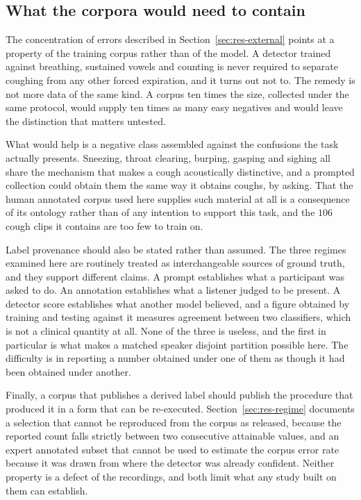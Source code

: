 \documentclass[pdflatex,sn-mathphys-num]{sn-jnl}
\begin{document}
\subsection{What the corpora would need to contain}\label{sec:disc-corpora}

The concentration of errors described in Section~\ref{sec:res-external} points at a
property of the training corpus rather than of the model. A detector trained against
breathing, sustained vowels and counting is never required to separate coughing from any
other forced expiration, and it turns out not to. The remedy is not more data of the same
kind. A corpus ten times the size, collected under the same protocol, would supply ten
times as many easy negatives and would leave the distinction that matters untested.

What would help is a negative class assembled against the confusions the task actually
presents. Sneezing, throat clearing, burping, gasping and sighing all share the mechanism
that makes a cough acoustically distinctive, and a prompted collection could obtain them
the same way it obtains coughs, by asking. That the human annotated corpus used here
supplies such material at all is a consequence of its ontology rather than of any
intention to support this task, and the $106$ cough clips it contains are too few to
train on.

Label provenance should also be stated rather than assumed. The three regimes examined
here are routinely treated as interchangeable sources of ground truth, and they support
different claims. A prompt establishes what a participant was asked to do. An annotation
establishes what a listener judged to be present. A detector score establishes what
another model believed, and a figure obtained by training and testing against it measures
agreement between two classifiers, which is not a clinical quantity at all. None of the
three is useless, and the first in particular is what makes a matched speaker disjoint
partition possible here. The difficulty is in reporting a number obtained under one of
them as though it had been obtained under another.

Finally, a corpus that publishes a derived label should publish the procedure that
produced it in a form that can be re-executed. Section~\ref{sec:res-regime} documents a
selection that cannot be reproduced from the corpus as released, because the reported
count falls strictly between two consecutive attainable values, and an expert annotated
subset that cannot be used to estimate the corpus error rate because it was drawn from
where the detector was already confident. Neither property is a defect of the recordings,
and both limit what any study built on them can establish.
\end{document}
